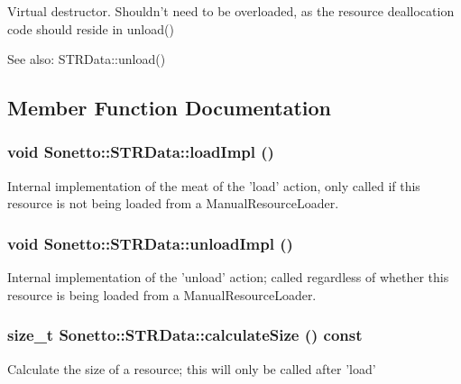 Virtual destructor. Shouldn't need to be overloaded, as the resource deallocation code should reside in unload() \begin{Desc}
\item[See also:]STRData::unload() \end{Desc}


\subsection{Member Function Documentation}
\subsubsection{\setlength{\rightskip}{0pt plus 5cm}void Sonetto::STRData::loadImpl ()\hspace{0.3cm}{\tt  [protected]}}\label{class_sonetto_1_1_s_t_r_data_75827b8b7c95e9e735679d89fd8467a1}


Internal implementation of the meat of the 'load' action, only called if this resource is not being loaded from a ManualResourceLoader. 
\subsubsection{\setlength{\rightskip}{0pt plus 5cm}void Sonetto::STRData::unloadImpl ()\hspace{0.3cm}{\tt  [protected]}}\label{class_sonetto_1_1_s_t_r_data_6109ca680426d6380c1f571b9946525b}


Internal implementation of the 'unload' action; called regardless of whether this resource is being loaded from a ManualResourceLoader. 
\subsubsection{\setlength{\rightskip}{0pt plus 5cm}size\_\-t Sonetto::STRData::calculateSize () const\hspace{0.3cm}{\tt  [protected]}}\label{class_sonetto_1_1_s_t_r_data_cf3c2c87b3ba0af6746e7d595d9ed3ef}


Calculate the size of a resource; this will only be called after 'load' 
